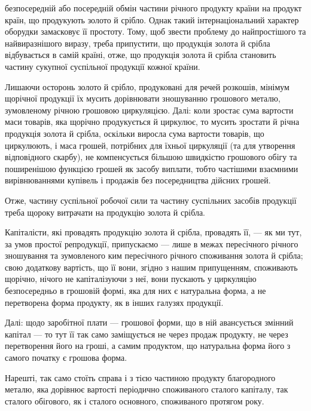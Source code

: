 \parcont{}  %
безпосередній або посередній обмін частини річного продукту країни на
продукт країн, що продукують золото й срібло. Однак такий інтернаціональний
характер оборудки замасковує її простоту. Тому, щоб звести
проблему до найпростішого та найвиразнішого виразу, треба припустити,
що продукція золота й срібла відбувається в самій країні, отже, що продукція
золота й срібла становить частину сукупної суспільної продукції
кожної країни.

Лишаючи осторонь золото й срібло, продуковані для речей розкошів,
мінімум щорічної продукції їх мусить дорівнювати зношуванню грошового
металю, зумовленому річною грошовою циркуляцією. Далі: коли
зростає сума вартости маси товарів, яка щорічно продукується й циркулює,
то мусить зростати й річна продукція золота й срібла, оскільки
виросла сума вартости товарів, що циркулюють, і маса грошей, потрібних
для їхньої циркуляції (та для утворення відповідного скарбу), не компенсується
більшою швидкістю грошового обігу та поширенішою функцією
грошей як засобу виплати, тобто частішими взаємними вирівнюваннями
купівель і продажів без посередництва дійсних грошей.

Отже, частину суспільної робочої сили та частину суспільних засобів
продукції треба щороку витрачати на продукцію золота й срібла.

Капіталісти, які провадять продукцію золота й срібла, провадять її, —
як ми тут, за умов простої репродукції, припускаємо — лише в межах
пересічного річного зношування та зумовленого ким пересічного річного
споживання золота й срібла; свою додаткову вартість, що її вони, згідно
з нашим припущенням, споживають щорічно, нічого не капіталізуючи з
неї, вони пускають у циркуляцію безпосередньо в грошовій формі, яка
для них є натуральна форма, а не перетворена форма продукту, як в інших
галузях продукції.

Далі: щодо заробітної плати — грошової форми, що в ній авансується
змінний капітал — то тут її так само заміщується не через продаж
продукту, не через перетворення його на гроші, а самим продуктом, що
натуральна форма його з самого початку є грошова форма.

Нарешті, так само стоїть справа і з тією частиною продукту благородного
металю, яка дорівнює вартості періодично споживаного сталого
капіталу, так сталого обігового, як і сталого основного, споживаного протягом
року.

